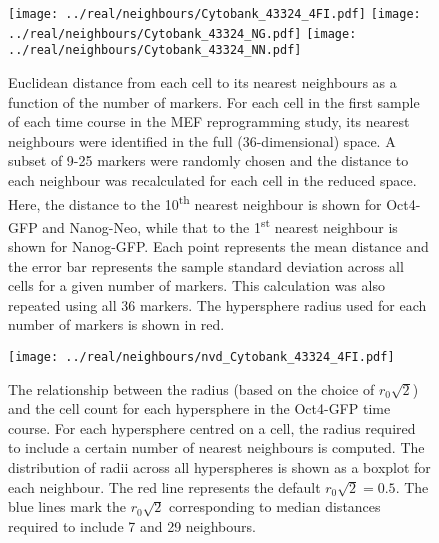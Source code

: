 \documentclass{article}
\begin{document}
\begin{figure}[p]
    \begin{center}
        \texttt{[image: ../real/neighbours/Cytobank\_43324\_4FI.pdf]}
        \texttt{[image: ../real/neighbours/Cytobank\_43324\_NG.pdf]}
        \texttt{[image: ../real/neighbours/Cytobank\_43324\_NN.pdf]}          
    \end{center}
    \caption{
        Euclidean distance from each cell to its nearest neighbours as a function of the number of markers.
        For each cell in the first sample of each time course in the MEF reprogramming study, its nearest neighbours were identified in the full (36-dimensional) space.
        A subset of 9-25 markers were randomly chosen and the distance to each neighbour was recalculated for each cell in the reduced space.
        Here, the distance to the 10\textsuperscript{th} nearest neighbour is shown for Oct4-GFP and Nanog-Neo, while that to the 1\textsuperscript{st} nearest neighbour is shown for Nanog-GFP.
        Each point represents the mean distance and the error bar represents the sample standard deviation across all cells for a given number of markers.
        This calculation was also repeated using all 36 markers.
        The hypersphere radius used for each number of markers is shown in red.
    }
    \label{fig:radius}
\end{figure}

\begin{figure}[p]
    \begin{center}
        \texttt{[image: ../real/neighbours/nvd\_Cytobank\_43324\_4FI.pdf]}
    \end{center}
    \caption{The relationship between the radius (based on the choice of $r_0\sqrt{2}$) and the cell count for each hypersphere in the Oct4-GFP time course.
        For each hypersphere centred on a cell, the radius required to include a certain number of nearest neighbours is computed.
        The distribution of radii across all hyperspheres is shown as a boxplot for each neighbour.
        The red line represents the default $r_0\sqrt{2}=0.5$.
        The blue lines mark the $r_0\sqrt{2}$ corresponding to median distances required to include 7 and 29 neighbours.
    }
    \label{fig:nvd}
\end{figure}
\end{document}
